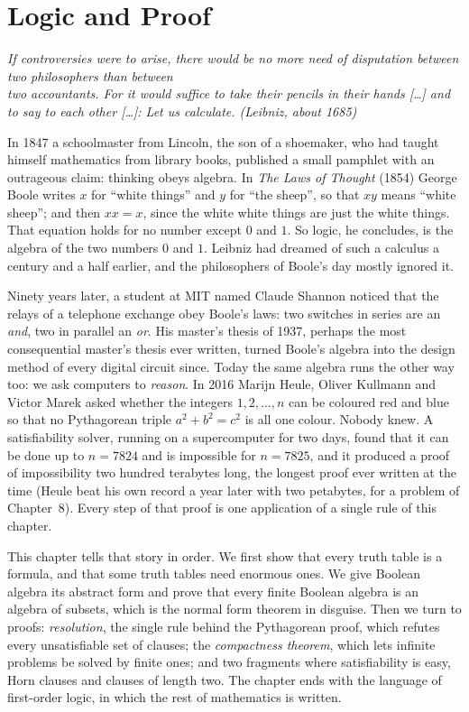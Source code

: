 \chapter{Logic and Proof}

\begin{center}\itshape
If controversies were to arise, there would be no more need of disputation between two philosophers than between\\
two accountants. For it would suffice to take their pencils in their hands [\dots] and to say to each other [\dots]: Let us calculate.
\upshape(Leibniz, about 1685)
\end{center}

In 1847 a schoolmaster from Lincoln, the son of a shoemaker, who had taught himself mathematics from library books,
published a small pamphlet with an outrageous claim: thinking obeys algebra. In \emph{The Laws of Thought} (1854) George Boole writes $x$ for ``white
things'' and $y$ for ``the sheep'', so that $xy$ means ``white sheep''; and then $xx=x$, since the white white things are
just the white things. That equation holds for no number except $0$ and $1$. So logic, he concludes, is the algebra of the two numbers $0$ and $1$. Leibniz had
dreamed of such a calculus a century and a half earlier, and the philosophers of Boole's day mostly ignored it.

Ninety years later, a student at MIT named Claude Shannon noticed that the relays of a telephone exchange obey
Boole's laws: two switches in series are an \emph{and}, two in parallel an \emph{or}. His master's thesis of 1937,
perhaps the most consequential master's thesis ever written, turned Boole's algebra into the design method of
every digital circuit since. Today the same algebra runs the other way too: we ask computers to \emph{reason}.
In 2016 Marijn Heule, Oliver Kullmann and Victor Marek asked whether the integers $1,2,\dots,n$ can be coloured red and
blue so that no Pythagorean triple $a^2+b^2=c^2$ is all one colour. Nobody knew. A satisfiability solver, running on a
supercomputer for two days, found that it can be done up to $n=7824$ and is impossible for $n=7825$, and it produced a
proof of impossibility two hundred terabytes long, the longest proof ever written at the time (Heule beat his own
record a year later with two petabytes, for a problem of Chapter~8). Every step of that proof is one application of a
single rule of this chapter.

This chapter tells that story in order. We first show that every truth table is a formula, and that some truth tables
need enormous ones. We give Boolean algebra its abstract form and prove that every finite Boolean algebra is an
algebra of subsets, which is the normal form theorem in disguise. Then we turn to proofs: \emph{resolution}, the single
rule behind the Pythagorean proof, which refutes every unsatisfiable set of clauses; the \emph{compactness theorem},
which lets infinite problems be solved by finite ones; and two fragments where satisfiability is easy, Horn clauses
and clauses of length two. The chapter ends with the language of first-order logic, in which the rest of
mathematics is written.

